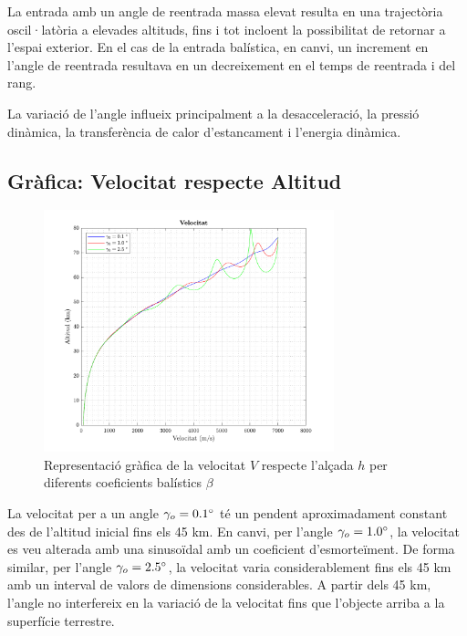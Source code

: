 \noindent
La entrada amb un angle de reentrada massa elevat resulta en una trajectòria oscil·latòria a elevades altituds, fins i tot incloent la possibilitat de retornar a l'espai exterior. En el cas de la entrada balística, en canvi, un increment en l'angle de reentrada resultava en un decreixement en el temps de reentrada i del rang.

La variació de l'angle influeix principalment a la desacceleració, la pressió dinàmica, la transferència de calor d'estancament i l'energia dinàmica.

\newpage
\subsection{Gràfica: Velocitat respecte Altitud}

\begin{figure}[ht]
    \centering
    \includegraphics[width=0.75\textwidth]{imagenes/02_lifting_graficas/velocitat.pdf}
    \caption{Representació gràfica de la velocitat $V$ respecte l'alçada $h$ per diferents coeficients balístics $\beta$}
    \label{fig:velocitat_lift}
\end{figure}

La velocitat per a un angle $\gamma_o = 0.1 \mathrm{^{\circ}} $ té un pendent aproximadament constant des de l'altitud inicial fins els 45 km. En canvi, per l'angle $\gamma_o = 1.0 \mathrm{^{\circ}} $, la velocitat es veu alterada amb una sinusoïdal amb un coeficient d'esmorteïment. De forma similar, per l'angle $\gamma_o = 2.5 \mathrm{^{\circ}} $, la velocitat varia considerablement fins els 45 km amb un interval de valors de dimensions considerables.\newline
A partir dels 45 km, l'angle no interfereix en la variació de la velocitat fins que l'objecte arriba a la superfície terrestre.
\newpage
